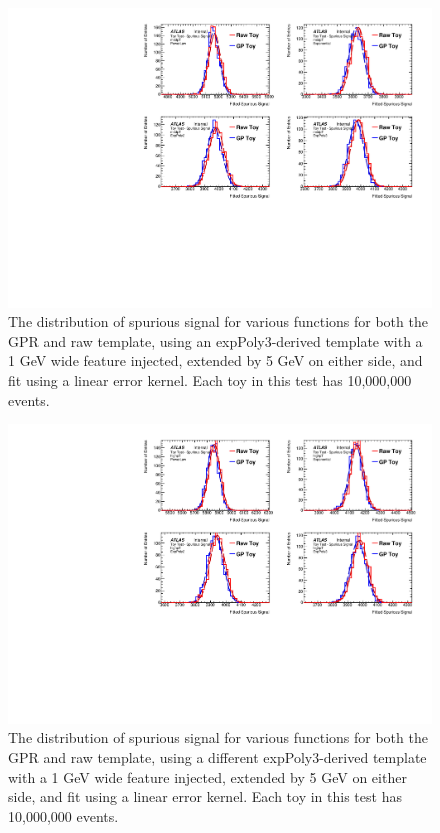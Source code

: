 \begin{figure} 
\begin{center}
  \includegraphics[width=\textwidth]{figures/background/gpr/validation/linear/ToyTest_FitSigVals_medpT_10M_Sig_1s}   
\caption{The distribution of spurious signal for various functions for both the GPR and raw template, using an expPoly3-derived template with a 1 GeV wide feature injected, extended by 5 GeV on either side, and fit using a linear error kernel. Each toy in this test has 10,000,000 events.}
\label{fig:linearkernel_medpt_10M_Sig_1s}
\end{center}
\end{figure}

\begin{figure} 
\begin{center}
  \includegraphics[width=\textwidth]{figures/background/gpr/validation/linear/ToyTest_FitSigVals_highpT_10M_Sig_1s}   
\caption{The distribution of spurious signal for various functions for both the GPR and raw template, using a different expPoly3-derived template with a 1 GeV wide feature injected, extended by 5 GeV on either side, and fit using a linear error kernel. Each toy in this test has 10,000,000 events.}
\label{fig:linearkernel_highpt_10M_Sig_1s}
\end{center}
\end{figure}

